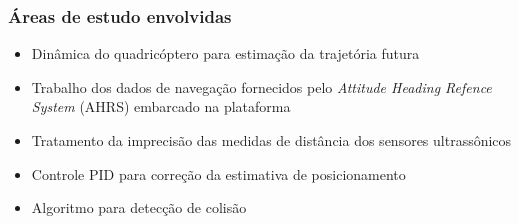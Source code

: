 \documentclass{beamer}
\begin{document}
\begin{frame}
	
	\frametitle{Áreas de estudo envolvidas}
	
	\begin{itemize}
		
		\item Dinâmica do quadricóptero para estimação da trajetória futura		
		
		\item Trabalho dos dados de navegação fornecidos pelo \textit{Attitude Heading Refence System} (AHRS) embarcado na plataforma
%		   	
		
		\item Tratamento da imprecisão das medidas de distância dos sensores ultrassônicos 
		
		\item Controle PID para correção da estimativa de posicionamento
		
		\item Algoritmo para detecção de colisão
		
%		
		
	\end{itemize}	

\end{frame}	
\end{document}
